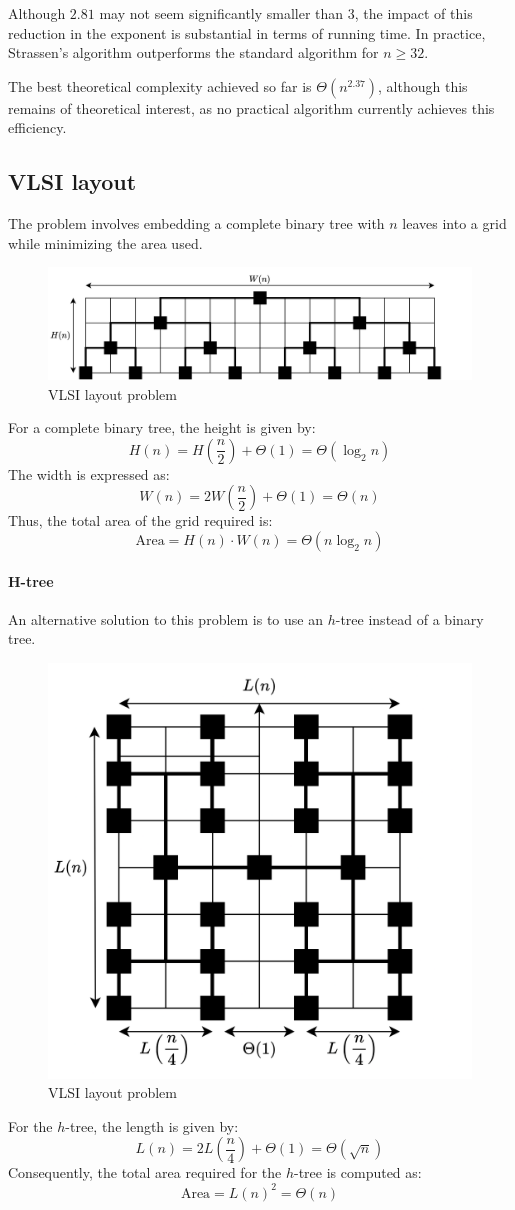 Although $2.81$ may not seem significantly smaller than $3$, the impact of this reduction in the exponent is substantial in terms of running time.
In practice, Strassen's algorithm outperforms the standard algorithm for $n \geq 32$.

The best theoretical complexity achieved so far is $\Theta\left(n^{2.37}\right)$, although this remains of theoretical interest, as no practical algorithm currently achieves this efficiency.

\subsection{VLSI layout}
The problem involves embedding a complete binary tree with $n$ leaves into a grid while minimizing the area used.
\begin{figure}[H]
    \centering
    \includegraphics[width=0.9\linewidth]{images/vlsi.png}
    \caption{VLSI layout problem}
\end{figure}
For a complete binary tree, the height is given by:
\[H(n)=H\left(\dfrac{n}{2}\right)+\Theta(1)=\Theta(\log_2n)\]
The width is expressed as:
\[W(n)=2W\left(\dfrac{n}{2}\right)+\Theta(1)=\Theta(n)\]
Thus, the total area of the grid required is:
\[\text{Area}=H(n)\cdot W(n)=\Theta(n\log_2n)\]

\paragraph*{H-tree}
An alternative solution to this problem is to use an $h$-tree instead of a binary tree.
\begin{figure}[H]
    \centering
    \includegraphics[width=0.55\linewidth]{images/vlsi1.png}
    \caption{VLSI layout problem}
\end{figure}
For the $h$-tree, the length is given by:
\[L(n)=2L\left(\dfrac{n}{4}\right)+\Theta(1)=\Theta(\sqrt{n})\]
Consequently, the total area required for the $h$-tree is computed as:
\[\text{Area}=L(n)^2=\Theta(n)\]